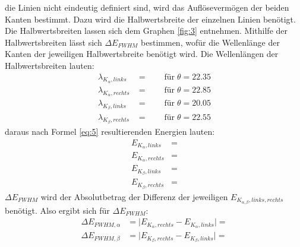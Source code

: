     \justifying die Linien nicht eindeutig definiert sind, wird das Auflösevermögen der beiden Kanten bestimmt. Dazu wird die 
    Halbwertsbreite der einzelnen Linien benötigt. Die Halbwertsbreiten lassen sich dem Graphen \ref{fig:3} entnehmen. Mithilfe der 
    Halbwertsbreiten lässt sich $\Delta E_{FWHM}$ bestimmen, wofür die Wellenlänge der Kanten der jeweiligen Halbwertsbreite benötigt wird. 
    Die Wellenlängen der Halbwertsbreiten lauten:
    \begin{subequations}\label{eq:14}
    \begin{align}
        \lambda_{K_{\alpha},links} &= \text{} \qquad \text{für}\;\theta = 22.35 \label{eq:14a}\\
        \lambda_{K_{\alpha},rechts} &= \text{} \qquad \text{für}\;\theta = 22.85 \label{eq:14b}\\
        \lambda_{K_{\beta},links} &= \text{} \qquad \text{für}\;\theta = 20.05 \label{eq:14c}\\
        \lambda_{K_{\beta},rechts} &= \text{} \qquad \text{für}\;\theta = 22.55 \label{eq:14d}
    \end{align}
    \end{subequations}
    \justifying daraus nach Formel \eqref{eq:5} resultierenden Energien lauten:
    \begin{subequations}\label{eq:15}
    \begin{align}
        E_{K_{\alpha},links} &= \text{} \label{eq:15a}\\
        E_{K_{\alpha},rechts} &= \text{} \label{eq:15b}\\
        E_{K_{\beta},links} &= \text{} \label{eq:15c}\\
        E_{K_{\beta},rechts} &= \text{} \label{eq:15d}
    \end{align}
    \end{subequations}
    \justifying $\Delta E_{FWHM}$ wird der Absolutbetrag der Differenz der jeweiligen $E_{K_{\alpha,\beta},links,rechts}$ benötigt.
    Also ergibt sich für $\Delta E_{FWHM}$:
    \begin{subequations}\label{eq:16}
    \begin{align}
        \Delta E_{FWHM, \alpha} &= \vert E_{K_{\alpha},rechts}-E_{K_{\alpha},links} \vert = \text{} \label{eq:16a}\\
        \Delta E_{FWHM, \beta} &= \vert E_{K_{\beta},rechts}-E_{K_{\beta},links} \vert = \text{} \label{eq:16b}
    \end{align}
    \end{subequations}
